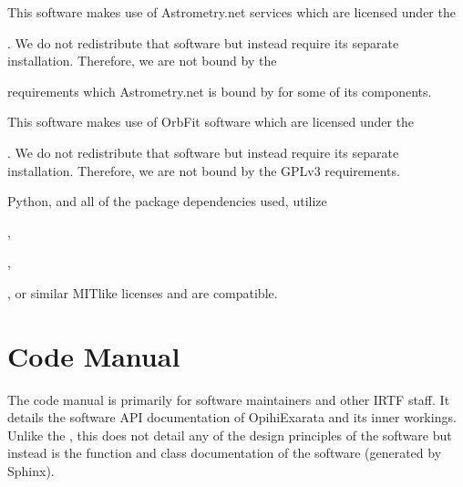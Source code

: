 \documentclass[letterpaper,11pt,english]{sphinxmanual}
\begin{document}
\sphinxAtStartPar
This software makes use of Astrometry.net services which are licensed
under the
%
\begin{footnote}[72]\sphinxAtStartFootnote
{}
%
\end{footnote}.
We do not redistribute that software but instead require its separate
installation. Therefore, we are not bound by the
%
\begin{footnote}[73]\sphinxAtStartFootnote
{}
%
\end{footnote} requirements which
Astrometry.net is bound by for some of its components.

\sphinxAtStartPar
This software makes use of OrbFit software which are licensed under the
%
\begin{footnote}[74]\sphinxAtStartFootnote
{}
%
\end{footnote}. We do not
redistribute that software but instead require its separate installation.
Therefore, we are not bound by the GPLv3 requirements.

\sphinxAtStartPar
Python, and all of the package dependencies used, utilize
%
\begin{footnote}[75]\sphinxAtStartFootnote
{}
%
\end{footnote},
%
\begin{footnote}[76]\sphinxAtStartFootnote
{}
%
\end{footnote},
%
\begin{footnote}[77]\sphinxAtStartFootnote
{}
%
\end{footnote},
or similar MIT\sphinxhyphen{}like licenses and are compatible.


\chapter{Code Manual}
\label{\detokenize{index:code-manual}}\label{\detokenize{index:home-code-manual}}
\sphinxAtStartPar
The code manual is primarily for software maintainers and other IRTF staff. It
details the software API documentation of OpihiExarata and its inner workings.
Unlike the {\hyperref[\detokenize{index:home-technical-manual}]{}}, this does not detail
any of the design principles of the software but instead is the function and
class documentation of the software (generated by Sphinx).
\end{document}
